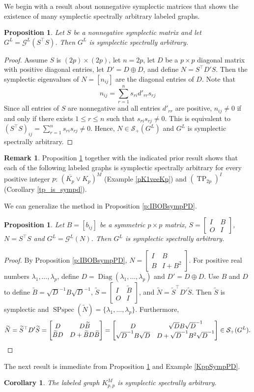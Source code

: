 \documentclass[12pt]{article}
\newtheorem{cor}[thm]{Corollary}
\newtheorem{prop}[thm]{Proposition}
\theoremstyle{definition}
\newtheorem{rem}[thm]{Remark}
\theoremstyle{definition}
\theoremstyle{definition}
\numberwithin{figure}{section}
\numberwithin{equation}{section}
\newcommand{\GL}[1]{\mathcal{G} ^ #1}
\newcommand{\G}{\mathcal{G}}
\newcommand{\symp}{\mathcal{S}_+}
\newcommand{\tp}{\operatorname{TP}}
\newcommand{\trans}{^{\top}}
\newcommand{\mtx}[1]{\begin{bmatrix} #1 \end{bmatrix}}
\newcommand{\diag}{\operatorname{Diag}}
\newcommand{\spspec}{\operatorname{SPspec}}
\newcommand{\x}{\times}
\newcommand{\lam}{\lambda}
\newcommand{\bpf}{\begin{proof}}
\newcommand{\epf}{\end{proof}\ms}
\newcommand{\ms}{\medskip}
\newcommand{\OL}{\overline}
\newcommand{\wt}{\widetilde}
\begin{document}
We begin with a result about nonnegative symplectic matrices that shows the existence of many symplectic spectrally arbitrary labeled graphs.


\begin{prop}\label{l:nonnegsymplectic}
 Let $S$ be a  nonnegative symplectic  matrix  and let $G^L=\GL L(S^\top S)$.
  Then $G^L$ is symplectic spectrally arbitrary.
\end{prop}

\begin{proof} Assume $S$ is $(2p)\x(2p)$, let $n=2p$, let $D$ be a $p\x p$ diagonal matrix with positive diagonal entries,  let $D'=D\oplus D$, and define $N=S^\top D'S$. Then  the  symplectic eigenvalues of $N=[n_{ij}]$ are the diagonal entries of $D$. Note that \[ 
n_{ij}=\sum_{r=1}^n s_{r i}d'_{rr}s_{r j}
\]
Since all entries of $S$ are nonnegative and all entries $d'_{rr}$ are positive, $n_{ij}\neq0$ if and only if there exists $1\leq r\leq n$ such that $s_{r i}s_{r j}\neq0$. This is equivalent to $(S^\top S)_{ij}=\sum_{r=1}^n s_{r i}s_{r j}\neq0$. Hence, $N\in \symp(G^L)$ and $G^L$ is symplectic spectrally arbitrary.
\end{proof}
 

\begin{rem}\label{manySSA}
Proposition \ref{l:nonnegsymplectic} together with the indicated prior result shows that   each of the following  labeled graphs is symplectic spectrally arbitrary for every positive integer $p$: $(\OL{K_p}\vee K_p)^{M}$ (Example \ref{pK1veeKp}) and 
    $(\tp_{2p})^I$ (Corollary \ref{tp_is_sympd}).  
\end{rem}


{We can generalize the method in Proposition \ref{p:IBOBsympPD}. 

\begin{prop}\label{IBOIisSSA} Let $B=[b_{ij}]$ be a symmetric $p\times p$ matrix,  $S=\mtx{I &  B\\O & I}$,   $N=S\trans S$ and  $G^L=\G^L(N)$.  Then $G^L$ is symplectic spectrally arbitrary.
\end{prop}
\bpf By Proposition \ref{p:IBOBsympPD}, $N=\mtx{I & B \\B & I+B^2}$. For {positive real numbers} $\lam_1,\dots,\lam_p$,  define $D=\diag(\lam_1,\dots,\lam_p)$ and $D'=D\oplus D$.  Use $B$ and $D$ to define 
    $\wt B=\sqrt D^{-1}B \sqrt D^{-1}$,   $\wt S=\mtx{I & \wt B\\O & I}$, and $\wt N=\wt S\trans D' \wt S$.  Then $\wt S$ is symplectic and  $\spspec({\wt N})=\{\lam_1,\dots,\lam_p\}$.  Furthermore,
\[ 
\wt N=\wt S\trans D' \wt S=\mtx{D & D\wt B \\
       \wt B D &  D+\wt B D\wt B }=
       \mtx{D & \sqrt D B \sqrt D^{-1}\\
       \sqrt D^{-1} B\sqrt D & D+\sqrt D^{-1}B^2 \sqrt D^{-1}}\in \symp(G^L). \qedhere
\] 
\epf
The next result is immediate from Proposition \ref{IBOIisSSA} and Example \ref{KppSympPD}.
\begin{cor}\label{KppSSA}
The labeled graph $K_{p,p}^M$ is  symplectic spectrally arbitrary.
 \end{cor}
}
\end{document}
